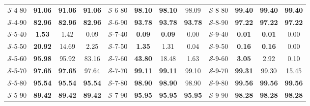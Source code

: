 \begin{table}[h]
{\begin{tabular}{cccc|cccc|cccc}
            $\mathcal{S}$-4-80 & \textbf{91.06} & \textbf{91.06} & \textbf{91.06} & 
            $\mathcal{S}$-6-80 & \textbf{98.10} & \textbf{98.10} & 98.09 & 
            $\mathcal{S}$-8-80 & \textbf{99.40} & \textbf{99.40} & \textbf{99.40} \\
            
            $\mathcal{S}$-4-90 & \textbf{82.96} & \textbf{82.96} & \textbf{82.96} & 
            $\mathcal{S}$-6-90 & \textbf{93.78} & \textbf{93.78} & \textbf{93.78} & 
            $\mathcal{S}$-8-90 & \textbf{97.22} & \textbf{97.22} & \textbf{97.22} \\
            
            $\mathcal{S}$-5-40 & \textbf{1.53} & 1.42 & 0.09 & 
            $\mathcal{S}$-7-40 & \textbf{0.09} & \textbf{0.09} & 0.00 &
            $\mathcal{S}$-9-40 & \textbf{0.01} & \textbf{0.01} & 0.00 \\
            
            $\mathcal{S}$-5-50 & \textbf{20.92} & 14.69 & 2.25 & 
            $\mathcal{S}$-7-50 & \textbf{1.35} & 1.31 & 0.04 &
            $\mathcal{S}$-9-50 & \textbf{0.16} & \textbf{0.16} & 0.00 \\
            
            $\mathcal{S}$-5-60 & \textbf{95.98} & 95.92 & 83.16 & 
            $\mathcal{S}$-7-60 & \textbf{43.80} & 18.48 & 1.63 &
            $\mathcal{S}$-9-60 & \textbf{3.05} & 2.92 & 0.10 \\
            
            $\mathcal{S}$-5-70 & \textbf{97.65} & \textbf{97.65} & 97.64 & 
            $\mathcal{S}$-7-70 & \textbf{99.11} & \textbf{99.11} & 99.10 &
            $\mathcal{S}$-9-70 & \textbf{99.31} & 99.30 & 15.45 \\
            
            $\mathcal{S}$-5-80 & \textbf{95.54} & \textbf{95.54} & \textbf{95.54} & 
            $\mathcal{S}$-7-80 & \textbf{98.90} & \textbf{98.90} & 98.90 &
            $\mathcal{S}$-9-80 & \textbf{99.56} & \textbf{99.56} & \textbf{99.56} \\
            
            $\mathcal{S}$-5-90 & \textbf{89.42} & \textbf{89.42} & \textbf{89.42} & 
            $\mathcal{S}$-7-90 & \textbf{95.95} & \textbf{95.95} & \textbf{95.95} &
            $\mathcal{S}$-9-90 & \textbf{98.28} & \textbf{98.28} & \textbf{98.28} \\
            
            \hline
        \end{tabular}
    }
\end{table}

